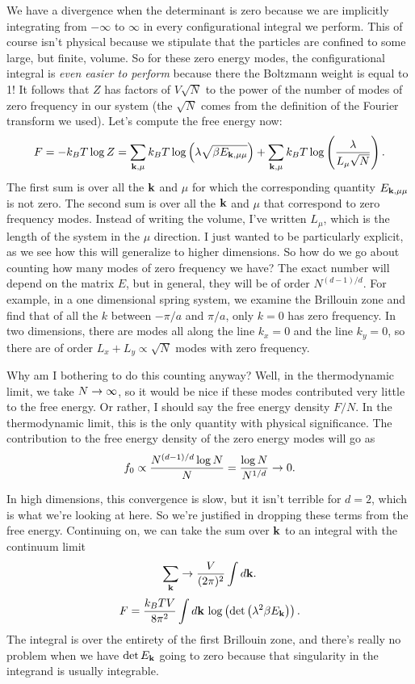 \documentclass[12pt]{article}
\begin{document}
We have a divergence when the determinant is zero because we are implicitly integrating from $-\infty$ to $\infty$ in every configurational integral we perform. This of course isn't physical because we stipulate that the particles are confined to some large, but finite, volume. So for these zero energy modes, the configurational integral is \emph{even easier to perform} because there the Boltzmann weight is equal to 1! It follows that $Z$ has factors of $V\sqrt{N}$ to the power of the number of modes of zero frequency in our system (the $\sqrt{N}$ comes from the definition of the Fourier transform we used). Let's compute the free energy now:
\[ F = -k_BT \log Z = \sum_{\mathbf{k},\mu} k_BT \log\left( \lambda \sqrt{\beta E_{\mathbf{k},\mu\mu}} \right) + \sum_{\mathbf{k}, \mu} k_BT \log\left(\frac{\lambda}{L_\mu \sqrt{N}} \right).\]
The first sum is over all the $\mathbf{k}$ and $\mu$ for which the corresponding quantity $E_{\mathbf{k},\mu\mu}$ is not zero. The second sum is over all the $\mathbf{k}$ and $\mu$ that correspond to zero frequency modes. Instead of writing the volume, I've written $L_\mu$, which is the length of the system in the $\mu$ direction. I just wanted to be particularly explicit, as we see how this will generalize to higher dimensions. So how do we go about counting how many modes of zero frequency we have? The exact number will depend on the matrix $E$, but in general, they will be of order $N^{(d-1)/d}$. For example, in a one dimensional spring system, we examine the Brillouin zone and find that of all the $k$ between $-\pi/a$ and $\pi/a$, only $k=0$ has zero frequency. In two dimensions, there are modes all along the line $k_x =0$ and the line $k_y = 0$, so there are of order $L_x + L_y \propto \sqrt{N}$ modes with zero frequency.

Why am I bothering to do this counting anyway? Well, in the thermodynamic limit, we take $N\rightarrow \infty$, so it would be nice if these modes contributed very little to the free energy. Or rather, I should say the free energy density $F/N$. In the thermodynamic limit, this is the only quantity with physical significance. The contribution to the free energy density of the zero energy modes will go as
\[ f_0 \propto \frac{N^{(d-1)/d} \log{N}}{N} = \frac{\log N}{N^{1/d}} \rightarrow 0.\]

In high dimensions, this convergence is slow, but it isn't terrible for $d=2$, 
which is what we're looking at here. So we're justified in dropping these 
terms from the free energy. Continuing on, we can take the sum over $\mathbf{k}$ to 
an integral with the continuum limit
\[ \sum_{\mathbf{k}} \rightarrow \frac{V}{(2\pi)^2} \int d\mathbf{k}.\]
\[ F = \frac{k_BT V}{8\pi^2} \int d \mathbf{k} \, \log \left(\det \left( \lambda^2 \beta E_{\mathbf{k}}\right)\right).\]
The integral is over the entirety of the first Brillouin zone, and there's really no problem when we have $\det E_{\mathbf{k}}$ going to zero because that singularity in the integrand is usually integrable.
\end{document}
